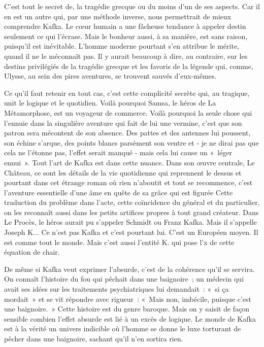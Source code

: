 \documentclass{book}
\begin{document}
C'est tout le secret de, la tragédie grecque ou du moins d'un de ses aspects. Car il en est un autre qui, par une méthode inverse, nous permettrait de mieux comprendre Kafka. Le cœur humain a une fâcheuse tendance à appeler destin seulement ce qui l'écrase. Mais le bonheur aussi, à sa manière, est sans raison, puisqu'il est inévitable. L'homme moderne pourtant s'en attribue le mérite, quand il ne le méconnaît pas. Il y aurait beaucoup à dire, au contraire, sur les destins privilégiés de la tragédie grecque et les favoris de la légende qui, comme, Ulysse, au sein des pires aventures, se trouvent sauvés d'eux-mêmes.

Ce qu'il faut retenir en tout cas, c'est cette complicité secrète qui, au tragique, unit le logique et le quotidien. Voilà pourquoi Samsa, le héros de La Métamorphose, est un voyageur de commerce. Voilà pourquoi la seule chose qui l'ennuie dans la singulière aventure qui fait de lui une vermine, c'est que son patron sera mécontent de son absence. Des pattes et des antennes lui poussent, son échine s'arque, des points blancs parsèment son ventre et ‑ je ne dirai pas que cela ne l'étonne pas, l'effet serait manqué ‑ mais cela lui cause un « léger ennui ». Tout l'art de Kafka est dans cette nuance. Dans son œuvre centrale, Le Château, ce sont les détails de la vie quotidienne qui reprennent le dessus et pourtant dans cet étrange roman où rien n'aboutit et tout se recommence, c'est l'aventure essentielle d'une âme en quête de sa grâce qui est figurée Cette traduction du problème dans l'acte, cette coïncidence du général et du particulier, on les reconnaît aussi dans les petits artifices propres à tout grand créateur. Dans Le Procès, le héros aurait pu s'appeler Schmidt ou Franz Kafka. Mais il s'appelle Joseph K... Ce n'est pas Kafka et c'est pourtant lui. C'est un Européen moyen. Il est comme tout le monde. Mais c'est aussi l'entité K. qui pose l'x de cette équation de chair.

De même si Kafka veut exprimer l'absurde, c'est de la cohérence qu'il se servira. On connaît l'histoire du fou qui pêchait dans une baignoire ; un médecin qui avait ses idées sur les traitements psychiatriques lui demandait : « si ça mordait » et se vit répondre avec rigueur : « Mais non, imbécile, puisque c'est une baignoire. » Cette histoire est du genre baroque. Mais on y saisit de façon sensible combien l'effet absurde est lié à un excès de logique. Le monde de Kafka est à la vérité un univers indicible où l'homme se donne le luxe torturant de pêcher dans une baignoire, sachant qu'il n'en sortira rien.
\end{document}
